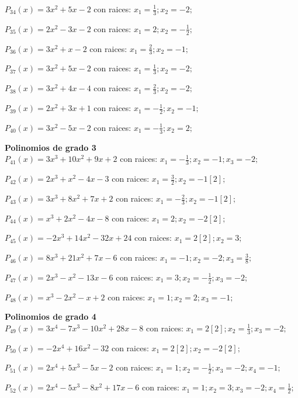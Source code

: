 \subitem $P_{34}(x) = 3x^2 + 5x - 2$ con raices: $x_1 = \frac{1}{3} ; x_2 = -2 ;  $

\subitem $P_{35}(x) = 2x^2 - 3x - 2$ con raices: $x_1 = 2 ; x_2 = -\frac{1}{2} ;  $

\subitem $P_{36}(x) = 3x^2 + x - 2$ con raices: $x_1 = \frac{2}{3} ; x_2 = -1 ;  $

\subitem $P_{37}(x) = 3x^2 + 5x - 2$ con raices: $x_1 = \frac{1}{3} ; x_2 = -2 ;  $

\subitem $P_{38}(x) = 3x^2 + 4x - 4$ con raices: $x_1 = \frac{2}{3} ; x_2 = -2 ;  $

\subitem $P_{39}(x) = 2x^2 + 3x + 1$ con raices: $x_1 = -\frac{1}{2} ; x_2 = -1 ;  $

\subitem $P_{40}(x) = 3x^2 - 5x - 2$ con raices: $x_1 = -\frac{1}{3} ; x_2 = 2 ;  $

\textbf{Polinomios de grado 3\\} 
\subitem $P_{41}(x) = 3x^3 + 10x^2 + 9x + 2$ con raices: $x_1 = -\frac{1}{3} ; x_2 = -1 ; x_3 = -2 ;  $

\subitem $P_{42}(x) = 2x^3 + x^2 - 4x - 3$ con raices: $x_1 = \frac{3}{2} ; x_2 = -1[2] ;  $

\subitem $P_{43}(x) = 3x^3 + 8x^2 + 7x + 2$ con raices: $x_1 = -\frac{2}{3} ; x_2 = -1[2] ;  $

\subitem $P_{44}(x) = x^3 + 2x^2 - 4x - 8$ con raices: $x_1 = 2 ; x_2 = -2[2] ;  $

\subitem $P_{45}(x) = -2x^3 + 14x^2 - 32x + 24$ con raices: $x_1 = 2[2] ; x_2 = 3 ;  $

\subitem $P_{46}(x) = 8x^3 + 21x^2 + 7x - 6$ con raices: $x_1 = -1 ; x_2 = -2 ; x_3 = \frac{3}{8} ;  $

\subitem $P_{47}(x) = 2x^3 - x^2 - 13x - 6$ con raices: $x_1 = 3 ; x_2 = -\frac{1}{2} ; x_3 = -2 ;  $

\subitem $P_{48}(x) = x^3 - 2x^2 - x + 2$ con raices: $x_1 = 1 ; x_2 = 2 ; x_3 = -1 ;  $

\textbf{Polinomios de grado 4\\} 
\subitem $P_{49}(x) = 3x^4 - 7x^3 - 10x^2 + 28x - 8$ con raices: $x_1 = 2[2] ; x_2 = \frac{1}{3} ; x_3 = -2 ;  $

\subitem $P_{50}(x) = -2x^4 + 16x^2 - 32$ con raices: $x_1 = 2[2] ; x_2 = -2[2] ;  $

\subitem $P_{51}(x) = 2x^4 + 5x^3 - 5x - 2$ con raices: $x_1 = 1 ; x_2 = -\frac{1}{2} ; x_3 = -2 ; x_4 = -1 ;  $

\subitem $P_{52}(x) = 2x^4 - 5x^3 - 8x^2 + 17x - 6$ con raices: $x_1 = 1 ; x_2 = 3 ; x_3 = -2 ; x_4 = \frac{1}{2} ;  $

